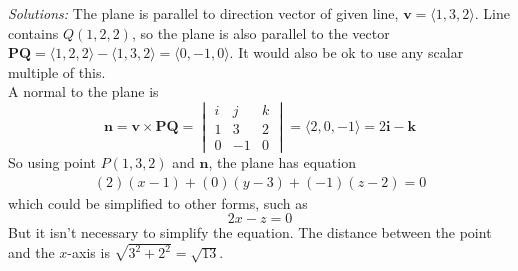 \ifnum {} {\color{DarkBlue} \textit{Solutions:} The plane is parallel to direction vector of given line, $\mathbf  v = \langle 1,3,2\rangle$. Line contains $Q(1,2,2)$, so the plane is also parallel to the vector $\mathbf{PQ} = \langle 1,2,2 \rangle - \langle 1,3,2 \rangle = \langle 0,-1,0 \rangle$. It would also be ok to use any scalar multiple of this. \\[12pt]
A normal to the plane is $$\mathbf n = \mathbf  v \times \mathbf {PQ} = \begin{vmatrix} i & j & k \\ 1&3&2 \\ 0&-1&0\end{vmatrix} = \langle 2,0,-1\rangle = 2\mathbf i-\mathbf k$$ So using point $P(1,3,2)$ and $\mathbf n$, the plane has equation \begin{align}
    (2)(x-1)+(0)(y-3) + (-1)(z-2) = 0 
\end{align}which could be simplified to other forms, such as $$2x-z=0$$ But it isn't necessary to simplify the equation. The distance between the point and the $x$-axis is $\sqrt{3^2+2^2} = \sqrt{13}$.
}
\else
  
\fi
\fi